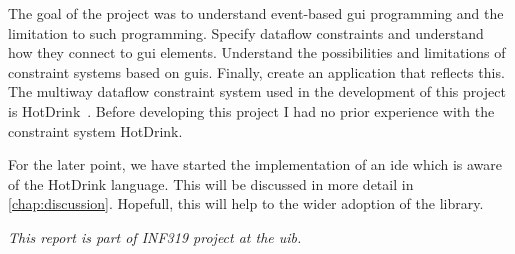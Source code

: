 The goal of the project was to understand event-based \gls{gui} programming and the limitation to such programming. Specify dataflow constraints and understand how they connect to \gls{gui} elements. Understand the possibilities and limitations of constraint systems based on \gls{gui}s. Finally, create an application that reflects this. The multiway dataflow constraint system used in the development of this project is HotDrink~\cite{HotDrink1}. Before developing this project I had no prior experience with the constraint system HotDrink.

For the later point, we have started the implementation of an \gls{ide} which is aware of the HotDrink language. This will be discussed in more detail in \autoref{chap:discussion}. Hopefull, this will help to the wider adoption of the library.

\textit{This report is part of INF319 project at the \gls{uib}.}
